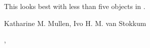 \documentclass{article}
\begin{document}
\begin{Details}\relax
This looks best with less than five objects in .
\end{Details}
\begin{Value}
\end{Value}
\begin{Author}\relax
Katharine M. Mullen, Ivo H. M. van Stokkum
\end{Author}
\begin{SeeAlso}\relax
{}, 
\end{SeeAlso}
\end{document}
